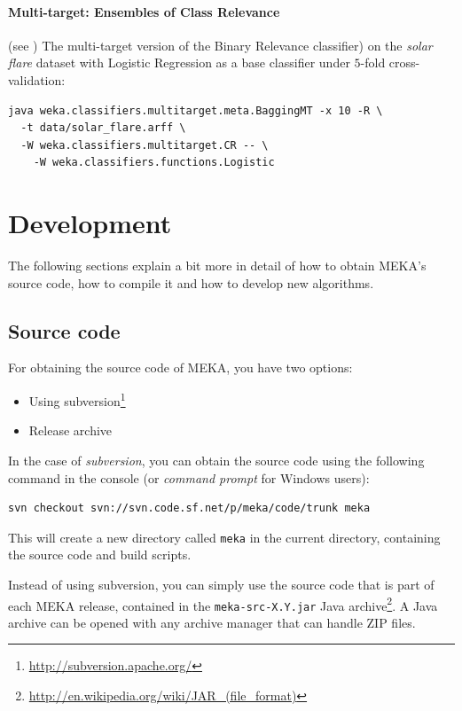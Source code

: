 \documentclass[11pt]{article}
\begin{document}
\paragraph{Multi-target: Ensembles of Class Relevance} (see \cite{UPM}) The multi-target version of the Binary Relevance classifier) on the \textit{solar flare} dataset with Logistic Regression as a base classifier under $5$-fold cross-validation:
\begin{lstlisting}
java weka.classifiers.multitarget.meta.BaggingMT -x 10 -R \
  -t data/solar_flare.arff \
  -W weka.classifiers.multitarget.CR -- \
    -W weka.classifiers.functions.Logistic
\end{lstlisting}


\section{Development}
\label{development}
The following sections explain a bit more in detail of how to obtain MEKA's source code, how to compile it and how to develop new algorithms.

\subsection{Source code}
\label{sourcecode}
For obtaining the source code of MEKA, you have two options:
\begin{itemize}
  \item Using subversion\footnote{\url{http://subversion.apache.org/}}
  \item Release archive
\end{itemize}

\noindent In the case of \textit{subversion}, you can obtain the source code using the following command in the console (or \textit{command prompt} for Windows users):
\begin{lstlisting}
svn checkout svn://svn.code.sf.net/p/meka/code/trunk meka
\end{lstlisting}
This will create a new directory called \texttt{meka} in the current directory, containing the source code and build scripts.

Instead of using subversion, you can simply use the source code that is part of each MEKA release, contained in the \texttt{meka-src-X.Y.jar} Java archive\footnote{\url{http://en.wikipedia.org/wiki/JAR\_(file\_format)}}. A Java archive can be opened with any archive manager that can handle ZIP files.
\end{document}
